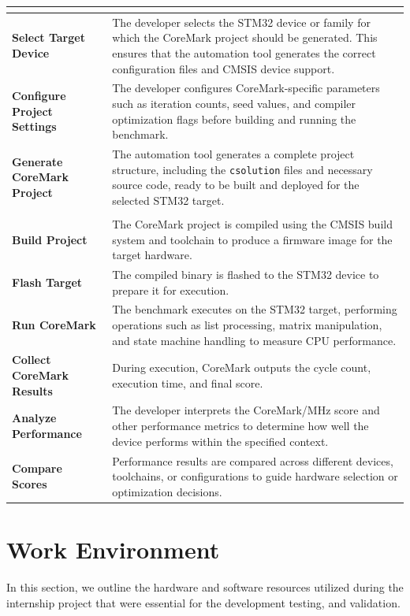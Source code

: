 \begin{xltabular}{\linewidth}{@{}>{\bfseries}l X@{}}
	 \\
	\midrule
	Select Target Device &
	The developer selects the STM32 device or family for which the CoreMark project should be generated. 
	This ensures that the automation tool generates the correct configuration files and CMSIS device support. \\
	\midrule
	Configure Project Settings &
	The developer configures CoreMark-specific parameters such as iteration counts, seed values, and compiler optimization flags 
	before building and running the benchmark. \\
	\midrule
	Generate CoreMark Project &
	The automation tool generates a complete project structure, including the \texttt{csolution} files and necessary source code, 
	ready to be built and deployed for the selected STM32 target. \\
	\midrule
	 \\
	\midrule
	Build Project &
	The CoreMark project is compiled using the CMSIS build system and toolchain to produce a firmware image for the target hardware. \\
	\midrule
	Flash Target &
	The compiled binary is flashed to the STM32 device to prepare it for execution.\\
	\midrule
	Run CoreMark &
	The benchmark executes on the STM32 target, performing operations such as list processing, matrix manipulation, and state machine handling 
	to measure CPU performance. \\
	\midrule
	Collect CoreMark Results &
	During execution, CoreMark outputs the cycle count, execution time, and final score. \\
	\midrule
	Analyze Performance &
	The developer interprets the CoreMark/MHz score and other performance metrics to determine how well the device performs within the specified context. \\
	\midrule
	Compare Scores &
	Performance results are compared across different devices, toolchains, or configurations to guide hardware selection or optimization decisions.
\end{xltabular}

\section{Work Environment}
In this section, we outline the hardware and software resources utilized during the internship project that were essential for the development testing, and validation.

